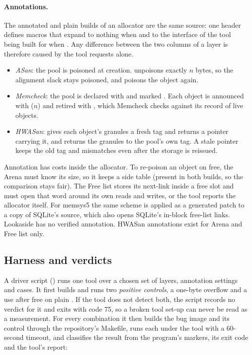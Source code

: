 \paragraph{Annotations.} The annotated and plain builds of an allocator are the same source: one header defines macros that expand to nothing when  and to the interface of the tool being built for when . Any difference between the two columns of a layer is therefore caused by the tool requests alone.
\begin{itemize}
\item \emph{ASan}: the pool is poisoned at creation.  unpoisons exactly $n$ bytes, so the alignment slack stays poisoned, and  poisons the object again.
\item \emph{Memcheck}: the pool is declared with  and marked . Each object is announced with ($n$) and retired with , which Memcheck checks against its record of live objects.
\item \emph{HWASan}:  gives each object's granules a fresh tag and returns a pointer carrying it, and  returns the granules to the pool's own tag. A stale pointer keeps the old tag and mismatches even after the storage is reissued.
\end{itemize}
Annotation has costs inside the allocator. To re-poison an object on free, the Arena must know its size, so it keeps a side table (present in both builds, so the comparison stays fair). The Free list stores its next-link inside a free slot and must open that word around its own reads and writes, or the tool reports the allocator itself. For memsys5 the same scheme is applied as a generated patch to a copy of SQLite's source, which also opens SQLite's in-block free-list links. Lookaside has no verified annotation. HWASan annotations exist for Arena and Free list only.

\subsection{Harness and verdicts}
\label{sec:harness}

A driver script () runs one tool over a chosen set of layers, annotation settings and cases. It first builds and runs two \emph{positive controls}, a one-byte overflow and a use after free on plain . If the tool does not detect both, the script records no verdict for it and exits with code 75, so a broken tool set-up can never be read as a measurement. For every combination it then builds the bug image and its control through the repository's Makefile, runs each under the tool with a 60-second timeout, and classifies the result from the program's markers, its exit code and the tool's report:


